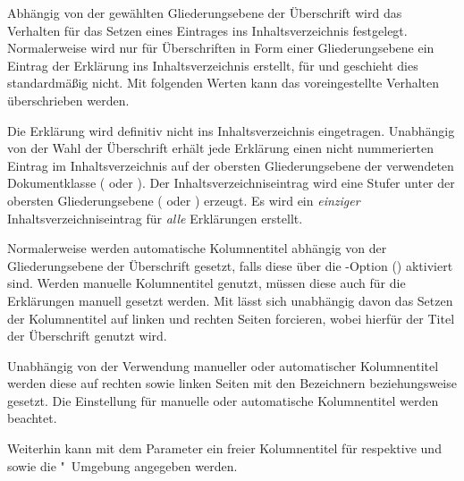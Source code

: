 \begin{DeclareEntity*}{}
\begin{DeclareEntity*}{}
\begin{DeclareEntity*}{}
\begin{Declaration}
Abhängig von der gewählten Gliederungsebene der Überschrift wird das Verhalten 
für das Setzen eines Eintrages ins Inhaltsverzeichnis festgelegt. Normalerweise 
wird nur für Überschriften in Form einer Gliederungsebene ein Eintrag der 
Erklärung ins Inhaltsverzeichnis erstellt, für  und 
 geschieht dies standardmäßig nicht. Mit folgenden 
Werten kann das voreingestellte Verhalten überschrieben werden.
\begin{DeclareValues}[Inhaltsverzeichnis]
  Die Erklärung wird definitiv nicht ins Inhaltsverzeichnis eingetragen.
  Unabhängig von der Wahl der Überschrift erhält jede Erklärung einen nicht
  nummerierten Eintrag im Inhaltsverzeichnis auf der obersten Gliederungsebene 
  der verwendeten Dokumentklasse ( oder ). 
  Der Inhaltsverzeichniseintrag wird eine Stufer unter der obersten 
  Gliederungsebene ( oder ) erzeugt.
  Es wird ein \emph{einziger} Inhaltsverzeichniseintrag für \emph{alle} 
  Erklärungen erstellt.
\end{DeclareValues}

%
%
Normalerweise werden automatische Kolumnentitel abhängig von der 
Gliederungsebene der Überschrift gesetzt, falls diese über die 
\KOMAScript-Option () aktiviert 
sind. Werden manuelle Kolumnentitel genutzt, müssen diese auch für die 
Erklärungen manuell gesetzt werden. Mit  lässt 
sich unabhängig davon das Setzen der Kolumnentitel auf linken und rechten 
Seiten forcieren, wobei hierfür der Titel der Überschrift genutzt wird.
\begin{DeclareValues}[Kolumnentitel]
  Unabhängig von der Verwendung manueller oder automatischer Kolumnentitel 
  werden diese auf rechten sowie linken Seiten mit den Bezeichnern 
   beziehungsweise  gesetzt.
  Die Einstellung für manuelle oder automatische Kolumnentitel werden beachtet.
\end{DeclareValues}

Weiterhin kann mit dem Parameter  ein 
freier Kolumnentitel für  respektive  
und  sowie die "~Umgebung angegeben 
werden.


\end{Declaration}
\end{DeclareEntity*}
\end{DeclareEntity*}
\end{DeclareEntity*}
